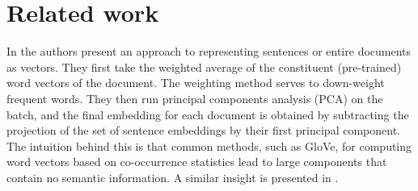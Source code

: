 \section{Related work}
In \citep{arora2017asimple} the authors present an approach to representing sentences or entire documents as vectors. They first take the weighted average of the constituent (pre-trained) word vectors of the document. The weighting method serves to down-weight frequent words. They then run principal components analysis (PCA) on the batch, and the final embedding for each document is obtained by subtracting the projection of the set of sentence embeddings by their first principal component. The intuition behind this is that common methods, such as GloVe, for computing word vectors based on co-occurrence statistics lead to large components that contain no semantic information. A similar insight is presented in \citep{arora2017asimple}.